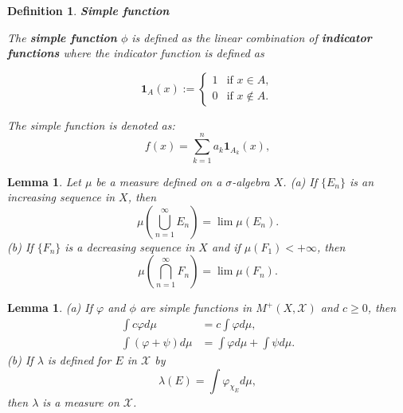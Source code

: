 \documentclass[12pt]{amsart}
\newtheorem{definition}{Definition}
\theoremstyle{plain}
\newtheorem{lemma}[thm]{Lemma}
\theoremstyle{definition}
\theoremstyle{remark}
\numberwithin{equation}{section}
\numberwithin{thm}{section}
\begin{document}
\begin{definition}
\textbf{Simple function}
 
The \textbf{simple function} $\phi$ is defined as the linear combination of \textbf{indicator functions} where the indicator function is defined as

\[
\mathbf{1}_{A}(x) := \begin{cases}
1 & \text{if } x \in A, \\
0 & \text{if } x \notin A.
\end{cases}
\]

The simple function is denoted as: \\
\[
f(x)=\sum _{{k=1}}^{n}a_{k}{{\mathbf  1}}_{{A_{k}}}(x),
\]
\end{definition} 
\begin{lemma} \label{lem:3.4Bartle}
    Let $\mu$ be a measure defined on a $\sigma$-algebra $X$.
    (a) If $\{E_n\}$ is an increasing sequence in $X$, then
    \begin{equation*}
        \mu(\bigcup_{n=1}^\infty E_n) = \lim \mu(E_n).
    \end{equation*}
    (b) If $\{ F_n \}$ is a decreasing sequence in $X$ and if $\mu(F_1) < +\infty$, then 
    \begin{equation*}
        \mu(\bigcap_{n=1}^\infty F_n) = \lim \mu(F_n).
    \end{equation*}
\end{lemma}
\begin{lemma} \label{lem:4.3Bartle}
    (a) If $\varphi$ and $\phi$ are simple functions in $M^+(X,\mathcal{X})$ and $c \geq 0$, then
    \begin{equation*}
        \begin{aligned}
            \int c \varphi d\mu & = c \int \varphi d\mu, \\
            \int (\varphi + \psi)d\mu &= \int \varphi d\mu + \int \psi d\mu.
        \end{aligned}
    \end{equation*}
    (b) If $\lambda$ is defined for $E$ in $\mathcal{X}$ by
    \begin{equation*}
        \lambda(E) = \int \varphi_{\chi_E}d\mu,
    \end{equation*}
    then $\lambda$ is a measure on $\mathcal{X}$.
\end{lemma}
\end{document}
